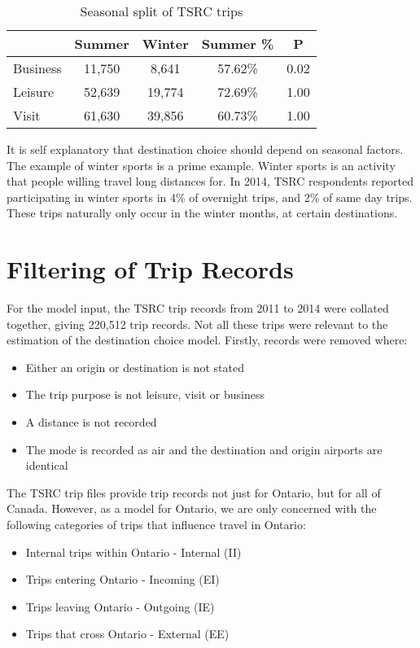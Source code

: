 \begin{table}[H]
\centering
\caption{Seasonal split of TSRC trips}
\label{table:season-split}
\begin{tabular}{p{4.07em}cccc}
\toprule
\multicolumn{1}{r}{} & \multicolumn{1}{p{5em}}{Summer} & \multicolumn{1}{p{4.645em}}{Winter} & \multicolumn{1}{p{3.93em}}{Summer \%} & P  \\ \midrule
Business & 11,750 & 8,641  & 57.62\% & 0.02 \\
Leisure & 52,639 & 19,774 & 72.69\% & 1.00 \\
Visit & 61,630 & 39,856 & 60.73\% & 1.00 \\ \bottomrule
\end{tabular}%

\end{table}


It is self explanatory that destination choice should depend on seasonal factors. The example of winter sports is a prime example. Winter sports is an activity that people willing travel long distances for. In 2014, TSRC respondents reported participating in winter sports in 4\% of overnight trips, and 2\% of same day trips. These trips naturally only occur in the winter months, at certain destinations. 

\section{Filtering of Trip Records}
For the model input, the TSRC trip records from 2011 to 2014 were collated together, giving 220,512 trip records. Not all these trips were relevant to the estimation of the destination choice model. Firstly, records were removed where:
\begin{itemize}
\item Either an origin or destination is not stated
\item The trip purpose is not leisure, visit or business
\item A distance is not recorded
\item The mode is recorded as air and the destination and origin airports are identical
\end{itemize}

The TSRC trip files provide trip records not just for Ontario, but for all of Canada. However, as a model for Ontario, we are only concerned with the following categories of trips that influence travel in Ontario:
\begin{itemize}
\item Internal trips within Ontario - Internal (II)
\item Trips entering Ontario - Incoming (EI)
\item Trips leaving Ontario - Outgoing (IE)
\item Trips that cross Ontario - External (EE)
\end{itemize}

